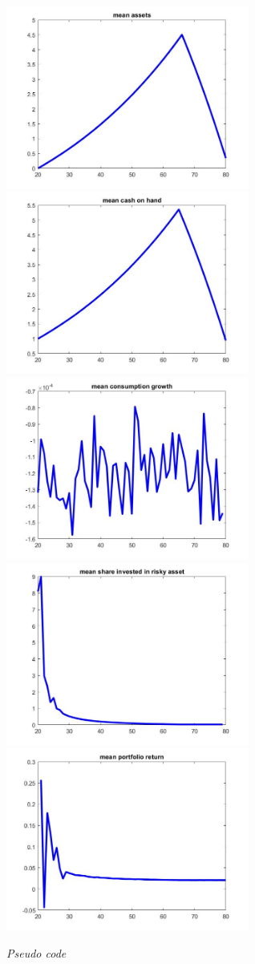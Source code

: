 \documentclass[a4paper,9pt, parskip=half-]{scrartcl}
\begin{document}
\begin{center}
\includegraphics[width=8cm]{Pic9}\includegraphics[width=8cm]{Pic10}\\
\includegraphics[width=8cm]{Pic11}\includegraphics[width=8cm]{Pic12}\\
\includegraphics[width=8cm]{Pic13}
\end{center}
\textit{Pseudo code}\\
\end{document}
